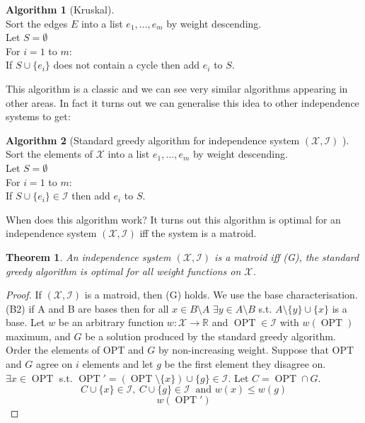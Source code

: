 \documentclass{article}
\newtheorem*{thm}{Theorem}
\theoremstyle{definition}
\newtheorem*{alg}{Algorithm}
\newcommand{\RR}{\mathbb{R}}
\newcommand{\X}{\mathcal{X}}
\newcommand{\I}{\mathcal{I}}
\DeclareMathOperator{\OPT}{OPT}
\begin{document}
\begin{alg}[Kruskal]~\\
Sort the edges $E$ into a list $e_1,\ldots,e_m$ by weight descending. \\
Let $S=\emptyset$ \\
For $i = 1$ to $m$:\\
\indent If $S\cup \{e_i\}$ does not contain a cycle then add $e_i$ to $S$.
\end{alg}

This algorithm is a classic and we can see very similar algorithms appearing in other areas.
In fact it turns out we can generalise this idea to other independence systems to get:

\begin{alg}[Standard greedy algorithm for independence system $(\X,\I)$ ]~\\
Sort the elements of $\X$ into a list $e_1,\ldots,e_m$ by weight descending. \\
Let $S=\emptyset$ \\
For $i = 1$ to $m$:\\
\indent If $S\cup \{e_i\}\in\I$ then add $e_i$ to $S$.
\end{alg}

When does this algorithm work?
It turns out this algorithm is optimal for an independence system $(\X,\I)$ iff the system is a matroid.

\begin{thm}
An independence system $(\X,\I)$ is a matroid iff (G), the standard greedy algorithm is optimal for all weight functions on $\X$.
\end{thm}

\begin{proof}
If $(\X,\I)$ is a matroid, then (G) holds.
We use the base characterisation.
(B2) if A and B are bases then for all $x\in B\setminus A$ $\exists y\in A\setminus B$ s.t. $A\setminus \{y\}\cup\{x\}$ is a base.
Let $w$ be an arbitrary function $w\colon \X \to \RR$ and $\OPT\in \I$ with $w(\OPT)$ maximum, and $G$ be a solution produced by the standard greedy algorithm.
Order the elements of OPT and $G$ by non-increasing weight.
Suppose that OPT and $G$ agree on $i$ elements and let $g$ be the first element they disagree on.
$\exists x \in \OPT$ s.t. $\OPT'=(\OPT \setminus \{x\}) \cup \{g\}\in\I$.
Let $C=\OPT\cap G$.
$$C\cup\{x\}\in \I,\ C\cup\{g\} \in \I\ \text{ and } w(x)\le w(g)$$
$$w(\OPT') $$
\end{proof}

\end{document}
